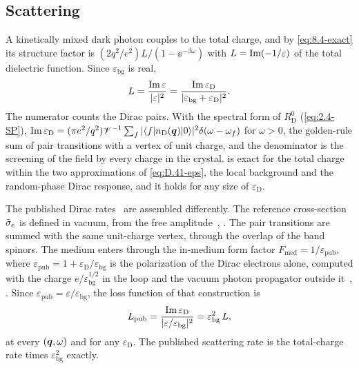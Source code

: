 \subsection*{Scattering}

A kinetically mixed dark photon couples to the total charge, and by \cref{eq:8.4-exact} its structure factor is $(2q^2/e^2)L/(1 - \ee^{-\beta\omega})$ with $L = \operatorname{Im}(-1/\varepsilon)$ of the total dielectric function. Since $\varepsilon_{\mathrm{bg}}$ is real,
\begin{equation}
  L = \frac{\operatorname{Im}\varepsilon}{|\varepsilon|^2} = \frac{\operatorname{Im}\varepsilon_{\mathrm{D}}}{|\varepsilon_{\mathrm{bg}} + \varepsilon_{\mathrm{D}}|^2} .
  \label{eq:D.41-L}
\end{equation}
The numerator counts the Dirac pairs. With the spectral form of $R^0_{\mathrm{D}}$ (\cref{eq:2.4-SP}), $\operatorname{Im}\varepsilon_{\mathrm{D}} = (\pi e^2/q^2)\mathscr{V}^{-1}\sum_f|\langle f|n_{\mathrm{D}}(\bm{q})|0\rangle|^2\delta(\omega - \omega_f)$ for $\omega > 0$, the golden-rule sum of pair transitions with a vertex of unit charge, and the denominator is the screening of the field by every charge in the crystal.  is exact for the total charge within the two approximations of \cref{eq:D.41-eps}, the local background and the random-phase Dirac response, and it holds for any size of $\varepsilon_{\mathrm{D}}$.

The published Dirac rates~\cite{hochberg2018detection,geilhufe2020dirac} are assembled differently. The reference cross-section $\bar{\sigma}_{e}$ is defined in vacuum, from the free amplitude~\cite[Eqs.~(3.8), (3.10), (3.11)]{hochberg2018detection}, \cite[Eqs.~(2.3), (2.4)]{geilhufe2020dirac}. The pair transitions are summed with the same unit-charge vertex, through the overlap of the band spinors. The medium enters through the in-medium form factor $F_{\mathrm{med}} = 1/\varepsilon_{\mathrm{pub}}$, where $\varepsilon_{\mathrm{pub}} = 1 + \varepsilon_{\mathrm{D}}/\varepsilon_{\mathrm{bg}}$ is the polarization of the Dirac electrons alone, computed with the charge $e/\varepsilon_{\mathrm{bg}}^{1/2}$ in the loop and the vacuum photon propagator outside it~\cite[Eqs.~(2.6), (3.7), (3.11), (A.8)]{hochberg2018detection}, \cite[Eqs.~(2.5)--(2.7), (3.3)]{geilhufe2020dirac}. Since $\varepsilon_{\mathrm{pub}} = \varepsilon/\varepsilon_{\mathrm{bg}}$, the loss function of that construction is
\begin{equation}
  L_{\mathrm{pub}} = \frac{\operatorname{Im}\varepsilon_{\mathrm{D}}}{|\varepsilon/\varepsilon_{\mathrm{bg}}|^2} = \varepsilon_{\mathrm{bg}}^2\,L ,
  \label{eq:D.41-Lpub}
\end{equation}
at every $(\bm{q},\omega)$ and for any $\varepsilon_{\mathrm{D}}$. The published scattering rate is the total-charge rate times $\varepsilon_{\mathrm{bg}}^2$ exactly.


